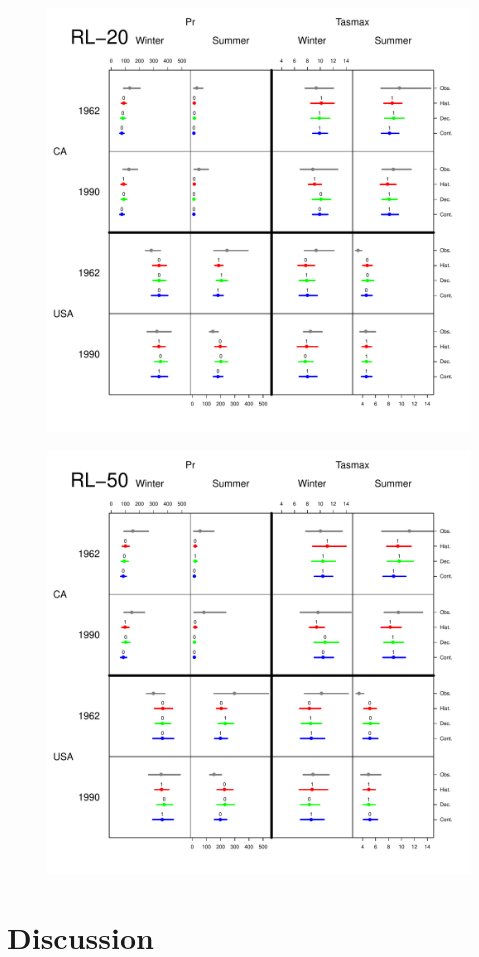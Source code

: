 \documentclass[12pt]{article}
\begin{document}
\begin{figure}
\begin{center}
\includegraphics[scale=0.5]{figs/rl20.pdf}
\end{center}
\end{figure}

\begin{figure}
\begin{center}
\includegraphics[scale=0.5]{figs/rl50.pdf}
\end{center}
\end{figure}

\section{Discussion}
\label{discussion}
\end{document}
